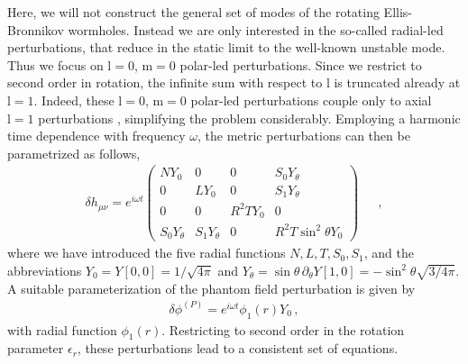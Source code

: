 \documentclass[aps,prd,12pt,superscriptaddress]{revtex4-2}
\begin{document}
Here, we will not construct the general set of modes of the rotating Ellis-Bronnikov wormholes.
Instead we are only interested in the so-called radial-led perturbations, that reduce in the static limit to the well-known unstable mode.
Thus we focus on $\mathrm{l}=0$, $\mathrm{m}=0$ polar-led perturbations. 
Since we restrict to second order in rotation, the infinite sum with respect to $\mathrm{l}$ is truncated already at $\mathrm{l}=1$.
Indeed, these $\mathrm{l}=0$, $\mathrm{m}=0$ polar-led  perturbations couple only to axial $\mathrm{l}=1$ perturbations \cite{Blazquez-Salcedo:2022eik}, simplifying the problem considerably.
Employing a harmonic time dependence with frequency $\omega$, the metric perturbations can then be parametrized as follows, 
\begin{eqnarray}
\label{met_pert}
\delta h_{\mu\nu}= e^{i\omega t}
    \begin{pmatrix}
NY_0 & 0    & 0 & {S}_0 Y_\theta \\
0   & LY_0 & 0 & {S}_1 Y_\theta \\
0 & 0 & R^2 TY_0 & 0 \\
{S}_0 Y_\theta & {S}_1 Y_\theta & 0 & R^2 T\sin^2{\theta}Y_0
\end{pmatrix} \, \, \, \, \, \, \, \, \, ,
\end{eqnarray}
where we have introduced the five radial functions $N, L, T, {S}_0, {S}_1$, and the abbreviations $Y_0=Y[0,0]=1/\sqrt{4\pi}$ and $Y_\theta=\sin{\theta} \, \partial_\theta Y[1,0] =-\sin^2{\theta}\sqrt{3/4\pi}$. 
A suitable parameterization of the phantom field perturbation is given by
\begin{eqnarray}
\label{phan_pert}
 \delta{\phi}^{(P)} = {e^{i\omega t}}{\phi_1(r)} Y_0 \, ,
\end{eqnarray}
with radial function $\phi_1(r)$.
Restricting to second order in the rotation parameter $\epsilon_r$, these perturbations lead to a consistent set of equations.
\end{document}

